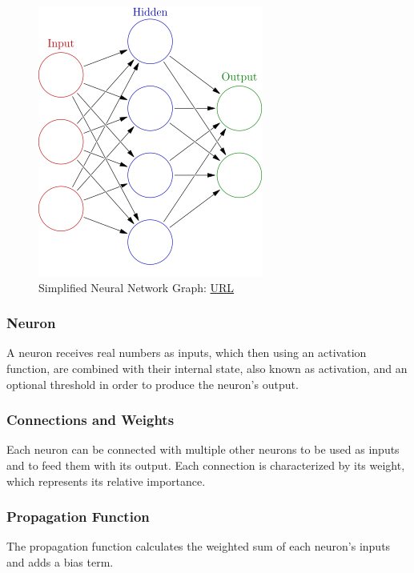 \begin{figure} [ht]
	\centering
	\includegraphics[scale=0.5]{Images/simplified-neural-network-graph.png}
	\decoRule
	\caption[Activation Function Graphs]{Simplified Neural Network Graph: \href{https://en.wikipedia.org/wiki/Artificial_neural_network}{URL}}
	\label{fig:simplified-neural-network-graph}
\end{figure}

\subsubsection{Neuron}
A neuron receives real numbers as inputs, which then using an activation function, are combined with their internal state, also known as activation, and an optional threshold in order to produce the neuron's output.

\subsubsection{Connections and Weights}
Each neuron can be connected with multiple other neurons to be used as inputs and to feed them with its output. Each connection is characterized by its weight, which represents its relative importance.

\subsubsection{Propagation Function}
The propagation function calculates the weighted sum of each neuron's inputs and adds a bias term.


